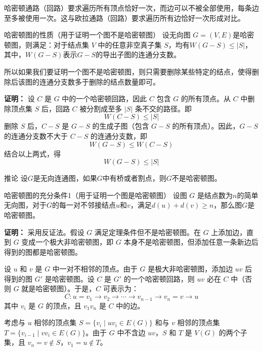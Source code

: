 哈密顿通路（回路）要求遍历所有顶点恰好一次，而边可以不被全部使用，每条边至多被使用一次。这与欧拉通路（回路）要求遍历所有边恰好一次形成对比。
\begin{theorem}{哈密顿图的性质（用于证明一个图不是哈密顿图）}{}
    设无向图 $G=(V,E)$是哈密顿图，则满足：对于结点集 $V$ 中的任意非空真子集 $S$，均有$W(G-S)\leqslant |S|$，其中，$W(G-S)$表示$G-S$的导出子图的连通分支数。

    所以如果我们要证明一个图不是哈密顿图，则只需要删除某些特定的结点，使得删除后该图的连通分支数多于删除的结点数量即可。
\end{theorem}
\textbf{证明：}
    设 $C$ 是 $G$ 中的一个哈密顿回路，因此 $C$ 包含 $G$ 的所有顶点。从 $C$ 中删除顶点集 $S$ 后，回路 $C$ 被分割成至多 $|S|$ 条不交的路径。即
    \[
    W(C - S) \leqslant |S|
    \]
删除 $S$ 后，$C - S$ 是 $G - S$ 的生成子图（包含 $G - S$ 的所有顶点）。因此，$G - S$ 的连通分支数不大于 $C - S$ 的连通分支数，即
    \[
    W(G - S) \leqslant W(C - S)
    \]
    结合以上两式，得
    \[
    W(G - S) \leqslant |S|
    \]
\begin{example}{推论}{}
    设$G$是无向连通图，如果$G$中有桥或者割点，则$G$不是哈密顿图。
\end{example}
\begin{theorem}{哈密顿图的充分条件1（用于证明一个图是哈密顿图）}{}
设图 $G$ 是结点数为$n$的简单无向图，对于$G$的每一对不邻接结点$u$和$v$，满足$d(u)+d(v)\geqslant n$，那么图$G$是哈密顿图。
\end{theorem}
\textbf{证明：}
采用反证法。假设 $G$ 满足定理条件但不是哈密顿图。在 $G$ 上添加边，直到 $G$ 变成一个极大非哈密顿图，即 $G$ 本身不是哈密顿图，但添加任意一条新边后得到的图都是哈密顿图。

设 $u$ 和 $v$ 是 $G$ 中一对不相邻的顶点。由于 $G$ 是极大非哈密顿图，添加边 $uv$ 后得到的图 $G'$ 是哈密顿图。设 $C$ 是 $G'$ 的一个哈密顿回路，则 $uv$ 必在 $C$ 中（否则 $G$ 就是哈密顿图）。于是，$C$ 可表示为：
\[
C: u = v_1 \to v_2 \to \cdots \to v_{n-1} \to v_n = v \to u
\]
其中 $v_i$ 是 $G$ 的顶点，且 $v_1 v_n$ 是 $C$ 中的边。

考虑与 $u$ 相邻的顶点集 $S = \{v_i \mid uv_{i} \in E(G)\}$ 和与 $v$ 相邻的顶点集 $T = \{v_{i-1} \mid v v_i \in E(G)\}$。由于 $G$ 中不含边 $uv$，$S$ 和 $T$ 是 $V(G)$ 的两个子集，且 $v_n = v \notin S$，$v_1 = u \notin T$。

